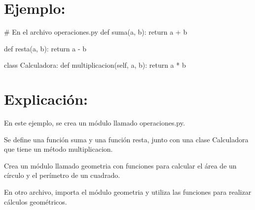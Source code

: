\documentclass[
  a4paper,
  onepage,
  openany]{scrreprt}
\newenvironment{Shaded}{\begin{snugshade}}{\end{snugshade}}
\newcommand{\CommentTok}[1]{\textcolor[rgb]{0.37,0.37,0.37}{#1}}
\newcommand{\ControlFlowTok}[1]{\textcolor[rgb]{0.00,0.23,0.31}{#1}}
\newcommand{\KeywordTok}[1]{\textcolor[rgb]{0.00,0.23,0.31}{#1}}
\newcommand{\NormalTok}[1]{\textcolor[rgb]{0.00,0.23,0.31}{#1}}
\newcommand{\OperatorTok}[1]{\textcolor[rgb]{0.37,0.37,0.37}{#1}}
\newcommand{\VariableTok}[1]{\textcolor[rgb]{0.07,0.07,0.07}{#1}}
\begin{document}
\hypertarget{ejemplo-60}{%
\section{Ejemplo:}\label{ejemplo-60}}

\begin{Shaded}
\begin{Highlighting}[]
\CommentTok{\# En el archivo operaciones.py}
\KeywordTok{def}\NormalTok{ suma(a, b):}
    \ControlFlowTok{return}\NormalTok{ a }\OperatorTok{+}\NormalTok{ b}

\KeywordTok{def}\NormalTok{ resta(a, b):}
    \ControlFlowTok{return}\NormalTok{ a }\OperatorTok{{-}}\NormalTok{ b}

\KeywordTok{class}\NormalTok{ Calculadora:}
    \KeywordTok{def}\NormalTok{ multiplicacion(}\VariableTok{self}\NormalTok{, a, b):}
        \ControlFlowTok{return}\NormalTok{ a }\OperatorTok{*}\NormalTok{ b}
\end{Highlighting}
\end{Shaded}

\hypertarget{explicaciuxf3n-60}{%
\section{Explicación:}\label{explicaciuxf3n-60}}

En este ejemplo, se crea un módulo llamado operaciones.py.

Se define una función suma y una función resta, junto con una clase
Calculadora que tiene un método multiplicacion.

\begin{tcolorbox}[enhanced jigsaw, breakable, opacityback=0, toptitle=1mm, coltitle=black, toprule=.15mm, rightrule=.15mm, colframe=quarto-callout-important-color-frame, opacitybacktitle=0.6, arc=.35mm, title=\textcolor{quarto-callout-important-color}{\faExclamation}\hspace{0.5em}{Actividad Práctica:}, titlerule=0mm, colbacktitle=quarto-callout-important-color!10!white, bottomtitle=1mm, bottomrule=.15mm, colback=white, left=2mm, leftrule=.75mm]

Crea un módulo llamado geometria con funciones para calcular el área de
un círculo y el perímetro de un cuadrado.

En otro archivo, importa el módulo geometria y utiliza las funciones
para realizar cálculos geométricos.

\end{tcolorbox}
\end{document}
